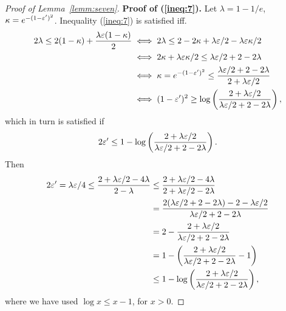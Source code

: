 \begin{proof}[Proof of Lemma~\ref{lemm:seven}]
  \textbf{Proof of (\ref{ineq:7}).}
  Let $\lambda = 1 - 1/e$, $\kappa = e^{-(1-\varepsilon' )^2}$.
  Inequality (\ref{ineq:7})
  is satisfied iff.
  \begin{align*}
    2 \lambda \le 2(1 - \kappa ) + \frac{\lambda \varepsilon (1 - \kappa )}{2} &\iff 2\lambda \le 2 - 2 \kappa + \lambda \varepsilon / 2 - \lambda \varepsilon \kappa / 2 \\
                                                                        &\iff 2 \kappa + \lambda \varepsilon \kappa /2 \le \lambda \varepsilon /2 + 2 - 2 \lambda \\
                                                                        &\iff \kappa = e^{-(1 - \varepsilon')^2} \le \frac{\lambda \varepsilon / 2 + 2 - 2 \lambda }{2 + \lambda \varepsilon / 2} \\
    &\iff (1 - \varepsilon' )^2 \ge \log \left( \frac{2 + \lambda \varepsilon / 2}{\lambda \varepsilon / 2 + 2 - 2 \lambda} \right),
  \end{align*}
  which in turn is satisfied if
  $$2 \varepsilon' \le 1 - \log \left( \frac{2 + \lambda \varepsilon / 2}{\lambda \varepsilon / 2 + 2 - 2 \lambda} \right).$$
  Then
  \begin{align*}
    2 \varepsilon' = \lambda \varepsilon / 4 \le \frac{2 + \lambda \varepsilon /2 - 4 \lambda}{2 - \lambda} &\le \frac{2 + \lambda \varepsilon / 2 - 4 \lambda}{2 + \lambda \varepsilon / 2 - 2 \lambda} \\
                                                                                     &= \frac{2 ( \lambda \varepsilon /2 + 2 - 2 \lambda ) - 2 - \lambda \varepsilon / 2}{\lambda \varepsilon /2 + 2 - 2 \lambda} \\
                                                                                     &= 2 - \frac{2 + \lambda \varepsilon / 2}{\lambda \varepsilon /2 + 2 - 2\lambda} \\
                                                                                     &= 1 - \left( \frac{2 + \lambda \varepsilon / 2}{\lambda \varepsilon /2 + 2 - 2\lambda} - 1 \right) \\
                                                                                     &\le 1 - \log \left( \frac{2 + \lambda \varepsilon / 2}{\lambda \varepsilon /2 + 2 - 2\lambda} \right),
  \end{align*}
  where we have used $\log x \le x - 1$, for $x > 0$.
\end{proof}